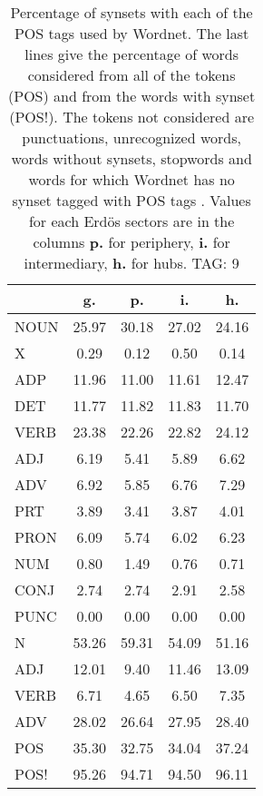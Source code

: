 \begin{table}[h!]
\begin{center}
\begin{tabular}{| l || c | c | c | c |}\hline
 & {\bf g.} & {\bf p.} & {\bf i.} & {\bf h.} \\\hline\hline
NOUN & 25.97  & 30.18  & 27.02  & 24.16 \\
X & 0.29  & 0.12  & 0.50  & 0.14 \\\hline
ADP & 11.96  & 11.00  & 11.61  & 12.47 \\
DET & 11.77  & 11.82  & 11.83  & 11.70 \\\hline
VERB & 23.38  & 22.26  & 22.82  & 24.12 \\\hline
ADJ & 6.19  & 5.41  & 5.89  & 6.62 \\
ADV & 6.92  & 5.85  & 6.76  & 7.29 \\\hline
PRT & 3.89  & 3.41  & 3.87  & 4.01 \\
PRON & 6.09  & 5.74  & 6.02  & 6.23 \\
NUM & 0.80  & 1.49  & 0.76  & 0.71 \\
CONJ & 2.74  & 2.74  & 2.91  & 2.58 \\
PUNC & 0.00  & 0.00  & 0.00  & 0.00 \\\hline\hline\hline
N & 53.26  & 59.31  & 54.09  & 51.16 \\\hline
ADJ & 12.01  & 9.40  & 11.46  & 13.09 \\\hline
VERB & 6.71  & 4.65  & 6.50  & 7.35 \\\hline
ADV & 28.02  & 26.64  & 27.95  & 28.40 \\\hline\hline
POS & 35.30  & 32.75  & 34.04  & 37.24 \\\hline
POS! & 95.26  & 94.71  & 94.50  & 96.11 \\\hline
\end{tabular}
\caption{Percentage of synsets with each of the POS tags used by Wordnet. The last lines give the percentage of words considered from all of the tokens (POS) and from the words with synset (POS!). The tokens not considered are punctuations, unrecognized words, words without synsets, stopwords and words for which Wordnet has no synset  tagged with POS tags . Values for each Erd\"os sectors are in the columns {{\bf p.}} for periphery, {{\bf i.}} for intermediary, {{\bf h.}} for hubs. TAG: 9}
\end{center}
\end{table}